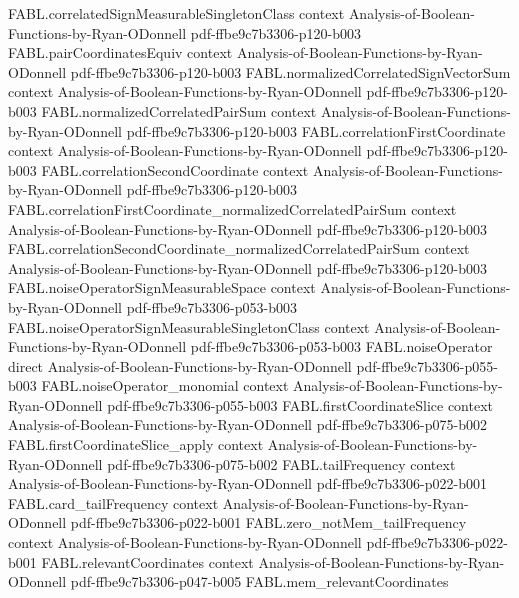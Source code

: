 \begin{theorem}
\proofstep
  {FABL.correlatedSignMeasurableSingletonClass}
  {context}
  {Analysis-of-Boolean-Functions-by-Ryan-ODonnell}
  {pdf-ffbe9c7b3306-p120-b003}
\proofstep
  {FABL.pairCoordinatesEquiv}
  {context}
  {Analysis-of-Boolean-Functions-by-Ryan-ODonnell}
  {pdf-ffbe9c7b3306-p120-b003}
\proofstep
  {FABL.normalizedCorrelatedSignVectorSum}
  {context}
  {Analysis-of-Boolean-Functions-by-Ryan-ODonnell}
  {pdf-ffbe9c7b3306-p120-b003}
\proofstep
  {FABL.normalizedCorrelatedPairSum}
  {context}
  {Analysis-of-Boolean-Functions-by-Ryan-ODonnell}
  {pdf-ffbe9c7b3306-p120-b003}
\proofstep
  {FABL.correlationFirstCoordinate}
  {context}
  {Analysis-of-Boolean-Functions-by-Ryan-ODonnell}
  {pdf-ffbe9c7b3306-p120-b003}
\proofstep
  {FABL.correlationSecondCoordinate}
  {context}
  {Analysis-of-Boolean-Functions-by-Ryan-ODonnell}
  {pdf-ffbe9c7b3306-p120-b003}
\proofstep
  {FABL.correlationFirstCoordinate_normalizedCorrelatedPairSum}
  {context}
  {Analysis-of-Boolean-Functions-by-Ryan-ODonnell}
  {pdf-ffbe9c7b3306-p120-b003}
\proofstep
  {FABL.correlationSecondCoordinate_normalizedCorrelatedPairSum}
  {context}
  {Analysis-of-Boolean-Functions-by-Ryan-ODonnell}
  {pdf-ffbe9c7b3306-p120-b003}
\proofstep
  {FABL.noiseOperatorSignMeasurableSpace}
  {context}
  {Analysis-of-Boolean-Functions-by-Ryan-ODonnell}
  {pdf-ffbe9c7b3306-p053-b003}
\proofstep
  {FABL.noiseOperatorSignMeasurableSingletonClass}
  {context}
  {Analysis-of-Boolean-Functions-by-Ryan-ODonnell}
  {pdf-ffbe9c7b3306-p053-b003}
\proofstep
  {FABL.noiseOperator}
  {direct}
  {Analysis-of-Boolean-Functions-by-Ryan-ODonnell}
  {pdf-ffbe9c7b3306-p055-b003}
\proofstep
  {FABL.noiseOperator_monomial}
  {context}
  {Analysis-of-Boolean-Functions-by-Ryan-ODonnell}
  {pdf-ffbe9c7b3306-p055-b003}
\proofstep
  {FABL.firstCoordinateSlice}
  {context}
  {Analysis-of-Boolean-Functions-by-Ryan-ODonnell}
  {pdf-ffbe9c7b3306-p075-b002}
\proofstep
  {FABL.firstCoordinateSlice_apply}
  {context}
  {Analysis-of-Boolean-Functions-by-Ryan-ODonnell}
  {pdf-ffbe9c7b3306-p075-b002}
\proofstep
  {FABL.tailFrequency}
  {context}
  {Analysis-of-Boolean-Functions-by-Ryan-ODonnell}
  {pdf-ffbe9c7b3306-p022-b001}
\proofstep
  {FABL.card_tailFrequency}
  {context}
  {Analysis-of-Boolean-Functions-by-Ryan-ODonnell}
  {pdf-ffbe9c7b3306-p022-b001}
\proofstep
  {FABL.zero_notMem_tailFrequency}
  {context}
  {Analysis-of-Boolean-Functions-by-Ryan-ODonnell}
  {pdf-ffbe9c7b3306-p022-b001}
\proofstep
  {FABL.relevantCoordinates}
  {context}
  {Analysis-of-Boolean-Functions-by-Ryan-ODonnell}
  {pdf-ffbe9c7b3306-p047-b005}
\proofstep
  {FABL.mem_relevantCoordinates}

\end{theorem}
